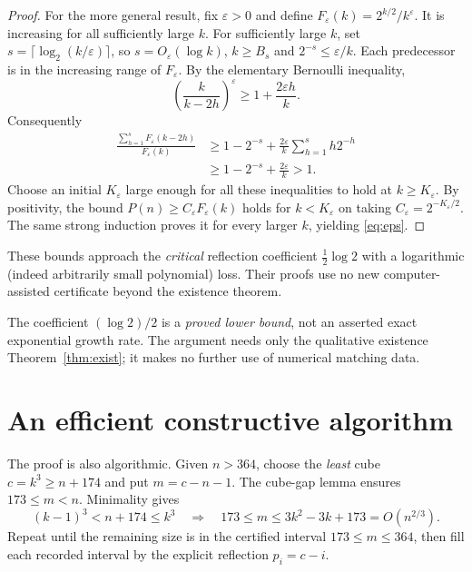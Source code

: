 \documentclass[10pt]{article}
\begin{document}
\begin{proof}
For the more general result, fix
$\varepsilon>0$ and define
$F_\varepsilon(k)=2^{k/2}/k^\varepsilon$.
It is increasing for all sufficiently
large $k$. For sufficiently large $k$,
set $s=\lceil\log_2(k/\varepsilon)\rceil$,
so $s=O_\varepsilon(\log k)$,
$k\ge B_s$ and
$2^{-s}\le\varepsilon/k$.
Each predecessor is in the increasing
range of $F_\varepsilon$. By the
elementary Bernoulli inequality,
\[
\left(\frac{k}{k-2h}\right)^\varepsilon
\ge1+\frac{2\varepsilon h}{k}.
\]
Consequently
\[
\begin{aligned}
\frac{\sum_{h=1}^s F_\varepsilon(k-2h)}
{F_\varepsilon(k)}
&\ge 1-2^{-s}
+\frac{2\varepsilon}{k}
 \sum_{h=1}^s h2^{-h}\\
&\ge1-2^{-s}+\frac{2\varepsilon}{k}>1.
\end{aligned}
\]
Choose an initial $K_\varepsilon$
large enough for all these inequalities
to hold at $k\ge K_\varepsilon$.
By positivity, the bound
$P(n)\ge C_\varepsilon F_\varepsilon(k)$
holds for $k<K_\varepsilon$ on taking
$C_\varepsilon=2^{-K_\varepsilon/2}$.
The same strong induction proves it
for every larger $k$, yielding
\eqref{eq:eps}.
\end{proof}

These bounds approach the \emph{critical}
reflection coefficient $\frac12\log2$
with a logarithmic (indeed arbitrarily small
polynomial) loss. Their proofs use no new
computer-assisted certificate beyond the
existence theorem.

The coefficient $(\log2)/2$ is a \emph{proved lower
bound}, not an asserted exact exponential growth rate.
The argument needs only the qualitative existence
Theorem~\ref{thm:exist}; it makes no further use of
numerical matching data.

\section{An efficient constructive algorithm}
The proof is also algorithmic. Given $n>364$, choose the
\emph{least} cube $c=k^3\ge n+174$ and put $m=c-n-1$.
The cube-gap lemma ensures $173\le m<n$. Minimality gives
\[
(k-1)^3<n+174\le k^3
\quad\Longrightarrow\quad
173\le m\le3k^2-3k+173=O(n^{2/3}).
\]
Repeat until the remaining size is in the certified interval
$173\le m\le364$, then fill each recorded interval by
the explicit reflection $p_i=c-i$.
\end{document}
